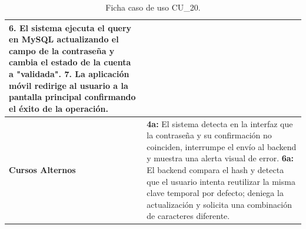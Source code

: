\begin{table}[htbp]
\begin{tabularx}{\textwidth}{|l|X|}
        \textbf{6.} El sistema ejecuta el query en MySQL actualizando el campo de la contraseña y cambia el estado de la cuenta a "validada".\newline
        \textbf{7.} La aplicación móvil redirige al usuario a la pantalla principal confirmando el éxito de la operación. \\ \hline
        \textbf{Cursos Alternos} & 
        \textbf{4a:} El sistema detecta en la interfaz que la contraseña y su confirmación no coinciden, interrumpe el envío al backend y muestra una alerta visual de error.\newline
        \textbf{6a:} El backend compara el hash y detecta que el usuario intenta reutilizar la misma clave temporal por defecto; deniega la actualización y solicita una combinación de caracteres diferente. \\ \hline
        \end{tabularx}
        \caption{Ficha caso de uso CU\_20.}
        \label{tab:cu_20}
        \end{table}

